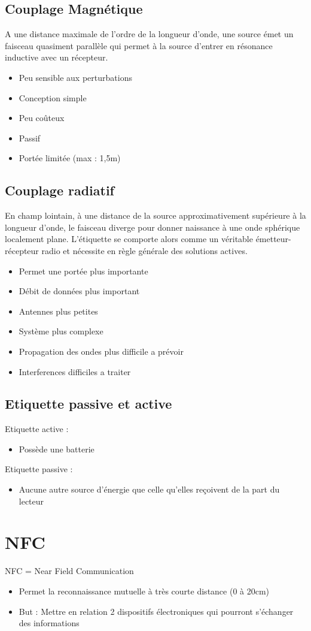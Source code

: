 \documentclass[a4paper]{article}
\begin{document}
\subsection{Couplage Magnétique}
A une distance maximale de l’ordre de la longueur d’onde, une source émet un
faisceau quasiment parallèle qui permet à la source d’entrer en
résonance inductive avec un récepteur.

\begin{itemize}
    \item Peu sensible aux perturbations
    \item Conception simple
    \item Peu coûteux
    \item Passif
    \item Portée limitée (max : 1,5m)
\end{itemize}

\subsection{Couplage radiatif}
En champ lointain, à une distance de la source
approximativement supérieure à la longueur
d’onde, le faisceau diverge pour donner
naissance à une onde sphérique localement
plane. L’étiquette se comporte alors
comme un véritable émetteur-récepteur radio et
nécessite en règle générale des solutions
actives. 

\begin{itemize}
    \item Permet une portée plus importante
    \item Débit de données plus important
    \item Antennes plus petites
    \item Système plus complexe
    \item Propagation des ondes plus difficile a prévoir
    \item Interferences difficiles a traiter
\end{itemize}

\subsection{Etiquette passive et active}

Etiquette active :
\begin{itemize}
    \item Possède une batterie
\end{itemize}
\vspace{0.5cm}
Etiquette passive :
\begin{itemize}
    \item Aucune autre source d’énergie que celle qu’elles reçoivent de la part du lecteur
\end{itemize}

\section{NFC}

NFC = Near Field Communication
\begin{itemize}
    \item Permet la reconnaissance mutuelle à très courte distance (0 à 20cm)
    \item But : Mettre en relation 2 dispositifs électroniques qui pourront s'échanger des informations
\end{itemize}
\end{document}
